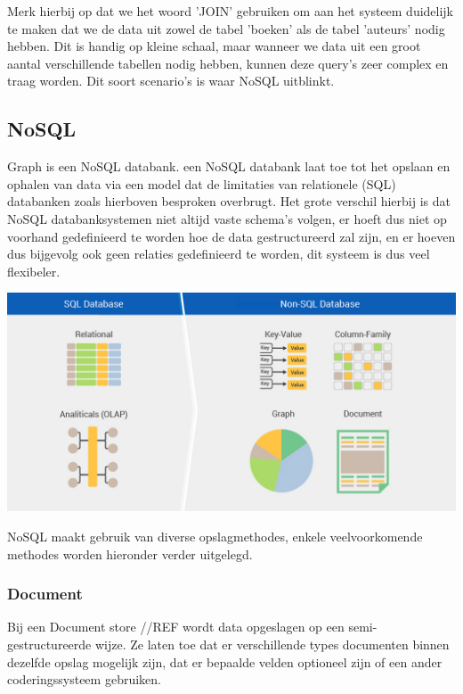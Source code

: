 Merk hierbij op dat we het woord  'JOIN' gebruiken om aan het systeem duidelijk te maken dat we de data uit zowel de tabel 'boeken' als de tabel 'auteurs' nodig hebben. Dit is handig op kleine schaal, maar wanneer we data uit een groot aantal verschillende tabellen nodig hebben, kunnen deze query's zeer complex en traag worden. Dit soort scenario's is waar NoSQL uitblinkt.


\subsection{NoSQL}
\label{sec:NoSQL}
Graph is een NoSQL databank. een NoSQL databank laat toe tot het opslaan en ophalen van data via een model dat de limitaties van relationele (SQL) databanken zoals hierboven besproken overbrugt. 
Het grote verschil hierbij is dat NoSQL databanksystemen niet altijd vaste schema's volgen, er hoeft dus niet op voorhand gedefinieerd te worden hoe de data gestructureerd zal zijn, en er hoeven dus bijgevolg ook geen relaties gedefinieerd te worden, dit systeem is dus veel flexibeler. 


	\includegraphics[width=\linewidth]{img/5_things_you_must_consider_before_nosql1.jpg}
	
NoSQL maakt gebruik van diverse opslagmethodes, enkele veelvoorkomende methodes worden hieronder verder uitgelegd. 


\subsubsection{Document}
\label{sec:Document}

Bij een Document store //REF wordt data opgeslagen op een semi-gestructureerde wijze. Ze laten toe dat er verschillende types documenten binnen dezelfde opslag mogelijk zijn, dat er bepaalde velden optioneel zijn of een ander coderingssysteem gebruiken.

